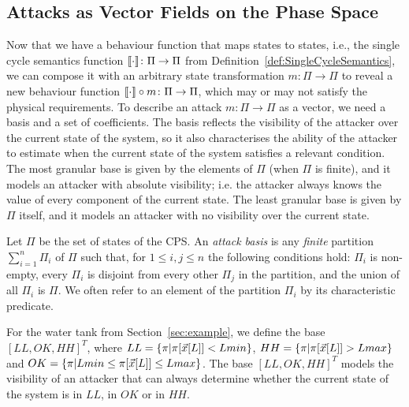 {\subsection{Attacks as Vector Fields on the Phase Space}
Now that we have a behaviour function that maps states to states, i.e., the single cycle semantics function ${{{\llbracket\cdot\rrbracket}}}\colon\Pi\rightarrow\Pi$ from Definition~\ref{def:SingleCycleSemantics}, we can compose it with an arbitrary state transformation $m\colon \Pi\rightarrow\Pi$ to reveal a new behaviour function ${{{\llbracket\cdot\rrbracket}}}\circ m\colon\Pi\rightarrow\Pi$, which may or may not satisfy the physical requirements. 
To describe an attack $m\colon \Pi\rightarrow \Pi$ as a vector, we need a basis and a set of coefficients. The basis reflects the visibility of the attacker over the current state of the system, so it also characterises the ability of the attacker to estimate when the current state of the system satisfies a relevant condition. The most granular base is given by the elements of $\Pi$ (when $\Pi$ is finite), and it models an attacker with absolute visibility; i.e. the attacker always knows the value of every component of the current state. The least granular base is given by $\Pi$ itself, and it models an attacker with no visibility over the current state.
\begin{definition}
  \label{def:AttackBasis}
Let $\Pi$ be the set of states of the CPS. An \emph{attack basis} is any \emph{finite} partition $\sum_{i=1}^n \Pi_i$ of $\Pi$ such that, for $1\leq i,j \leq n$ the following conditions hold: $\Pi_i$ is non-empty, every $\Pi_i$ is disjoint from every other $\Pi_j$ in the partition, and the union of all $\Pi_i$ is $\Pi$. We often refer to an element of the partition $\Pi_i$ by its characteristic predicate.
\end{definition}
\begin{example}
  \label{ex:AttackBasis}
  For the water tank from Section~\ref{sec:example}, we define the base $[LL, OK, HH]^T$, where ${LL}=\left\{\pi| \pi[\vec{x}[L]]<Lmin\right\}$, ${HH}=\left\{\pi| \pi[\vec{x}[L]]>Lmax\right\}$ and ${OK}=\left\{\pi|Lmin \leq \pi[\vec{x}[L]]\leq Lmax\right\}$. The base $[LL, OK, HH]^T$ models the visibility of an attacker that can always determine whether the current state of the system is in $LL$, in $OK$ or in $HH$.  %
\end{example}

}
